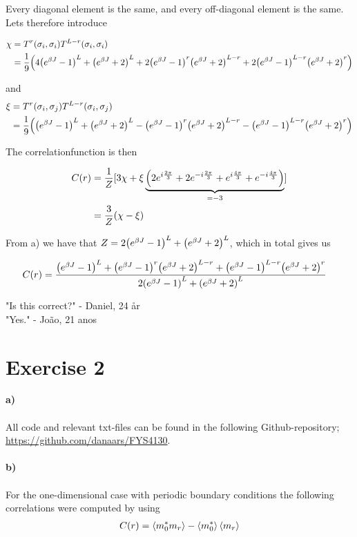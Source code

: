 \documentclass[12pt]{article}
\begin{document}
Every diagonal element is the same, and every off-diagonal element is the same.
Lets therefore introduce

\begin{align*}
    \chi &= T^r(\sigma_i, \sigma_i)T^{L-r}(\sigma_i,
    \sigma_i)\\ 
    &= \frac{1}{9}\qty(4\qty(e^{\beta J}-1)^L + \qty(e^{\beta J}+2)^L + 2\qty(e^{\beta
J}-1)^r\qty(e^{\beta J}+2)^{L-r} + 2\qty(e^{\beta J}-1)^{L-r}\qty(e^{\beta
J}+2)^r)
\end{align*}

and 
\begin{align*}
    \xi &= T^r(\sigma_i, \sigma_j)T^{L-r}(\sigma_i, \sigma_j)\\
    &=\frac{1}{9}\qty(\qty(e^{\beta J}-1)^L + \qty(e^{\beta J}+2)^L-
    \qty(e^{\beta J}-1)^r\qty(e^{\beta J}+2)^{L-r} - \qty(e^{\beta
    J}-1)^{L-r}\qty(e^{\beta J}+2)^r)
\end{align*}

The correlationfunction is then

\begin{align*}
    C(r) &= \frac{1}{Z}[3\chi + \xi\underbrace{\qty(2e^{i\frac{2\pi}{3}} + 2e^{-i\frac{2\pi}{3}} +
    e^{i\frac{4\pi}{3}} + e^{-i\frac{4\pi}{3}})}_{= -3}] \\
    &= \frac{3}{Z}\qty(\chi - \xi)
\end{align*}

From a) we have that $Z = 2\qty(e^{\beta J}-1)^L + \qty(e^{\beta J}+2)^L$, which
in total gives us

\begin{align*}
    C(r) &= \frac{\qty(e^{\beta J}-1)^L + \qty(e^{\beta J}-1)^r\qty(e^{\beta
    J}+2)^{L-r} + \qty(e^{\beta J}-1)^{L-r}\qty(e^{\beta J}+2)^r}{2\qty(e^{\beta J}-1)^L + \qty(e^{\beta J}+2)^L}
\end{align*}

"Is this correct?" - Daniel, 24 år \\
"Yes."  - João, 21 anos

\newpage
\section*{Exercise 2}

\textbf{a)} \\
\\
\noindent All code and relevant txt-files can be found in the following
Github-repository; \url{https://github.com/danaars/FYS4130}. \\
\\
\textbf{b)} \\
\\
For the one-dimensional case with periodic boundary conditions the following
correlations were computed by using
\begin{align*}
    C(r) = \expval{m_0^*m_r} - \expval{m_0^*}\expval{m_r}
\end{align*}
\end{document}
